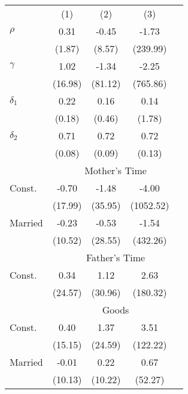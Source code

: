 \begin{tabular}{lcccc}\\\toprule
&(1)&(2)&(3)&\\\cmidrule(r){2-5}$\rho$&0.31&-0.45&-1.73&\\
&(1.87)&(8.57)&(239.99)&\\
$\gamma$&1.02&-1.34&-2.25&\\
&(16.98)&(81.12)&(765.86)&\\
$\delta_{1}$&0.22&0.16&0.14&\\
&(0.18)&(0.46)&(1.78)&\\
$\delta_{2}$&0.71&0.72&0.72&\\
&(0.08)&(0.09)&(0.13)&\\
& \multicolumn{4}{c}{Mother's Time}\\\cmidrule(r){2-5}Const.&-0.70&-1.48&-4.00&\\
&(17.99)&(35.95)&(1052.52)&\\
Married&-0.23&-0.53&-1.54&\\&(10.52)&(28.55)&(432.26)&\\& \multicolumn{4}{c}{Father's Time}\\\cmidrule(r){2-5}Const.&0.34&1.12&2.63&\\
&(24.57)&(30.96)&(180.32)&\\
& \multicolumn{4}{c}{Goods}\\\cmidrule(r){2-5}Const.&0.40&1.37&3.51&\\
&(15.15)&(24.59)&(122.22)&\\
Married&-0.01&0.22&0.67&\\&(10.13)&(10.22)&(52.27)&\\\bottomrule\end{tabular}